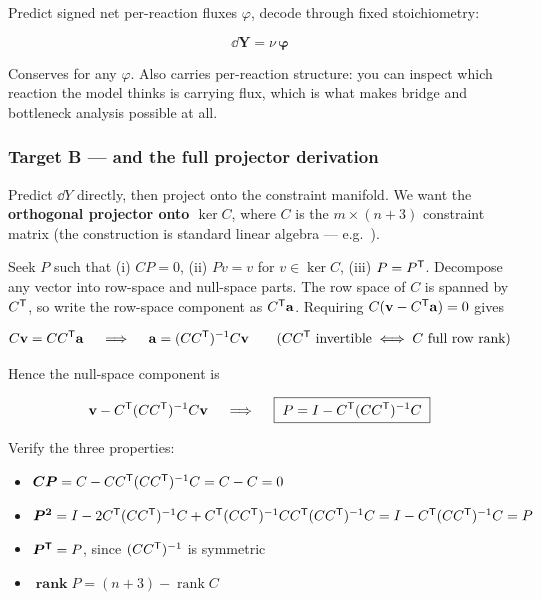 Predict signed net per-reaction fluxes $\varphi$, decode through fixed
stoichiometry:

\begin{equation*}
\dd\mathbf{Y} = \nu\,\boldsymbol{\varphi}
\end{equation*}

Conserves for any $\varphi$. Also carries per-reaction structure: you can
inspect which reaction the model thinks is carrying flux, which is what makes
bridge and bottleneck analysis possible at all.

\subsubsection{Target B --- and the full projector derivation}
\label{sec:targetB}

Predict $\dd Y$ directly, then project onto the constraint manifold. We want the
\textbf{orthogonal projector onto $\ker C$}, where $C$ is the $m \times (n+3)$
constraint matrix (the construction is standard linear algebra --- e.g.\
\citealt{golub2013}).

Seek $P$ such that (i) $CP = 0$, (ii) $P v = v$ for $v \in \ker C$, (iii)
$P = P^{\mathsf{T}}$. Decompose any vector into row-space and null-space parts. The row
space of $C$ is spanned by $C^{\mathsf{T}}$, so write the row-space component as
$C^{\mathsf{T}}\mathbf{a}$. Requiring $C(\mathbf{v} - C^{\mathsf{T}}\mathbf{a}) = 0$ gives

\begin{equation*}
C\mathbf{v} = CC^{\mathsf{T}}\mathbf{a} \quad\implies\quad
\mathbf{a} = (CC^{\mathsf{T}})^{-1} C\mathbf{v} \qquad
(CC^{\mathsf{T}} \text{ invertible} \iff C \text{ full row rank})
\end{equation*}

Hence the null-space component is

\begin{equation}
\mathbf{v} - C^{\mathsf{T}}(CC^{\mathsf{T}})^{-1}C\mathbf{v} \quad\implies\quad
\boxed{\;P = I - C^{\mathsf{T}}(CC^{\mathsf{T}})^{-1}C\;}
\label{eq:projector}
\end{equation}

Verify the three properties:

\begin{itemize}
\item $\boldsymbol{CP} = C - CC^{\mathsf{T}}(CC^{\mathsf{T}})^{-1}C = C - C = 0$ \yes
\item $\boldsymbol{P^2} = I - 2C^{\mathsf{T}}(CC^{\mathsf{T}})^{-1}C
       + C^{\mathsf{T}}(CC^{\mathsf{T}})^{-1}CC^{\mathsf{T}}(CC^{\mathsf{T}})^{-1}C
       = I - C^{\mathsf{T}}(CC^{\mathsf{T}})^{-1}C = P$ \yes
\item $\boldsymbol{P^{\mathsf{T}}} = P$, since $(CC^{\mathsf{T}})^{-1}$ is symmetric \yes
\item $\operatorname{\mathbf{rank}} P = (n+3) - \operatorname{rank} C$ \yes
\end{itemize}


